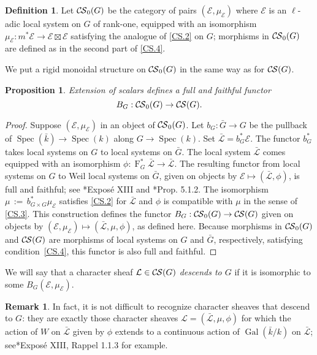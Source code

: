 \documentclass[10pt]{amsart}
\theoremstyle{plain}
\newtheorem{proposition}[theorem]{Proposition}
\theoremstyle{definition}
\newtheorem{definition}[theorem]{Definition}
\newtheorem{remark}[theorem]{Remark}
\newcommand{\bFq}{\bar{k}}
\newcommand{\Fq}{k}
\DeclareMathOperator{\Gal}{Gal}
\newcommand{\Frob}[1]{\operatorname{F}_{#1}}
\newcommand{\Spec}[1]{{\operatorname{Spec}(#1)}}
\newcommand{\ceq}{{\, :=\, }}
\newcommand{\cs}[1]{{\mathcal{#1}}}
\newcommand{\gcs}[1]{{\mathcal{\bar #1}}}
\newcommand{\CS}{{\mathcal{C\hskip-0.8pt S}}}
\newcommand{\bCS}{{\CS_0}}
\newcommand{\bG}{\bar{G}}
\begin{document}
\begin{definition}
Let $\bCS(G)$ be the category of pairs $(\cs{E},\mu_\cs{E})$
where $\cs{E}$ is an $\ell$-adic local system on $G$ of rank-one,
equipped with an isomorphism $\mu_\cs{E} : m^* \cs{E} \to \cs{E} \boxtimes \cs{E}$
satisfying the analogue of \ref{CS.2} on $G$;
morphisms in $\bCS(G)$ are defined as in the second part of
\ref{CS.4}. 
\end{definition}

We put a rigid monoidal structure on $\bCS(G)$ in the same way as for $\CS(G)$.

\begin{proposition}\label{prop:BG}
Extension of scalars defines a full and faithful functor
\[
B_G : \bCS(G) \to \CS(G).
\]
\end{proposition}

\begin{proof}
 Suppose $(\cs{E},\mu_\cs{E})$ in an object of $\bCS(G)$.
 Let $b_G : \bG \to G$ be the pullback of $\Spec{\bFq} \to \Spec{\Fq}$ along $G\to \Spec{\Fq}$.
 Set $\gcs{L} = b_G^* \cs{E}$. 
 The functor $b_G^*$ takes local systems on $G$ to local systems on $\bG$.
 The local system $\gcs{L}$ comes equipped with an isomorphism
 $\phi: \Frob{G}^* \gcs{L} \to \gcs{L}$.
 The resulting functor from local systems on $G$ to Weil local systems on $\bG$, given on objects by $\cs{E} \mapsto (\gcs{L},\phi)$, 
 is full and faithful; see \cite{deligne-katz:SGA7.2}*{Expos\'e XIII} and \cite{beilinson-bernstein-deligne:81a}*{Prop. 5.1.2}.
 The isomorphism $\mu \ceq b_{G\times G}^*\mu_\cs{E}$ satisfies \ref{CS.2}
 for $\gcs{L}$ and $\phi$ is compatible with $\mu$ in the sense of \ref{CS.3}.
 This construction defines the functor $B_G : \bCS(G) \to \CS(G)$ given on objects by $(\cs{E},\mu_\cs{E}) \mapsto (\gcs{L},\mu, \phi)$, as defined here. 
 Because morphisms in $\bCS(G)$ and $\CS(G)$ are morphisms of local systems on $G$ and $\bG$, respectively, satisfying condition~\ref{CS.4}, this functor is also full and faithful.
\end{proof}

We will say that a character sheaf $\cs{L} \in \CS(G)$ \emph{descends to $G$} if it is isomorphic to some $B_G(\cs{E}, \mu_\cs{E})$.

\begin{remark}\label{rem:descent}
In fact, it is not difficult to recognize character sheaves that descend to $G$: they are exactly those character sheaves $\cs{L} = (\gcs{L},\mu,\phi)$ for which the action of $W$ on $\gcs{L}$ given by $\phi$ extends to a continuous action of $\Gal(\bFq/\Fq)$ on $\gcs{L}$; see\cite{deligne-katz:SGA7.2}*{Expos\'e XIII, Rappel 1.1.3} for example. 
\end{remark}
\end{document}
